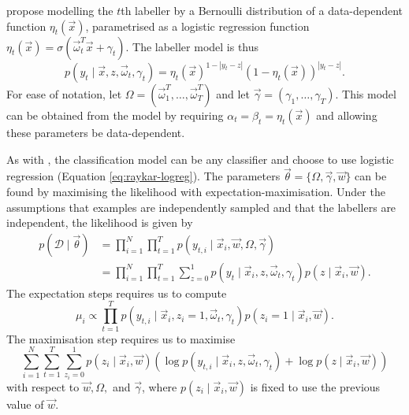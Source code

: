
        \citet{yan10} propose modelling the $t$th labeller by a Bernoulli distribution of a data-dependent function $\eta_t(\vec x)$, parametrised as a logistic regression function $\eta_t(\vec x) = \sigma(\vec \omega_t^T \vec x + \gamma_t)$. The labeller model is thus
        \begin{equation*}
            p(y_t \mid \vec x, z, \vec \omega_t, \gamma_t) = \eta_t(\vec x)^{1 - |y_t - z|} (1 - \eta_t(\vec x))^{|y_t - z|}.
        \end{equation*}
        For ease of notation, let $\Omega = (\vec \omega_1^T, \dots, \vec \omega_T^T)$ and let $\vec \gamma = (\gamma_1, \dots, \gamma_T)$. This model can be obtained from the \citeauthor{raykar10} model by requiring $\alpha_t = \beta_t = \eta_t(\vec x)$ and allowing these parameters be data-dependent.

        As with \citeauthor{raykar10}, the classification model can be any classifier and \citeauthor{yan10} choose to use logistic regression (Equation \ref{eq:raykar-logreg}). The parameters $\vec \theta = \{\Omega, \vec \gamma, \vec w\}$ can be found by maximising the likelihood with expectation-maximisation. Under the assumptions that examples are independently sampled and that the labellers are independent, the likelihood is given by
        \begin{align*}
            p(\mathcal D \mid \vec \theta) &= \prod_{i = 1}^N \prod_{t = 1}^T p(y_{t, i} \mid \vec x_i, \vec w, \Omega, \vec \gamma)\\ &= \prod_{i = 1}^N \prod_{t = 1}^T \sum_{z = 0}^1 p(y_t \mid \vec x_i, z, \vec \omega_t, \gamma_t) p(z \mid \vec x_i, \vec w).
        \end{align*}
        The expectation steps requires us to compute
        \[
            \mu_i \propto \prod_{t = 1}^{T} p(y_{t, i} \mid \vec x_i, z_i = 1, \vec \omega_t, \gamma_t) p(z_i = 1 \mid \vec x_i, \vec w).
        \]
        The maximisation step requires us to maximise
        \begin{equation*}
            \sum_{i = 1}^N \sum_{t = 1}^T \sum_{z_i = 0}^1 p(z_i \mid \vec x_i, \vec w) (\log p(y_{t, i} \mid \vec x_i, z, \vec \omega_t, \gamma_t) + \log p(z \mid \vec x_i, \vec w))
        \end{equation*}
        with respect to $\vec w, \Omega,$ and $\vec \gamma$, where $p(z_i \mid \vec x_i, \vec w)$ is fixed to use the previous value of $\vec w$.